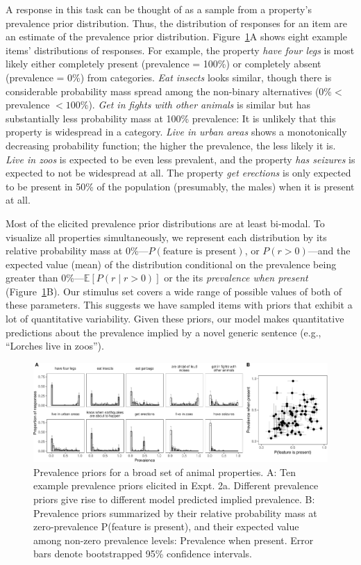 \documentclass[floatsintext,doc]{apa6}
\begin{document}
A response in this task can be thought of as a sample from a property's prevalence prior distribution.
Thus, the distribution of responses for an item are an estimate of the prevalence prior distribution.
Figure~\ref{fig:genInt-prevPrior}A shows eight example items' distributions of responses.
For example, the property \emph{have four legs} is most likely either completely present (prevalence = 100\%) or completely absent (prevalence = 0\%) from categories.
\emph{Eat insects} looks similar, though there is considerable probability mass spread among the non-binary alternatives (\(0\% <\) prevalence \(< 100\%\)).
\emph{Get in fights with other animals} is similar but has substantially less probability mass at 100\% prevalence: It is unlikely that this property is widespread in a category.
\emph{Live in urban areas} shows a monotonically decreasing probability function; the higher the prevalence, the less likely it is.
\emph{Live in zoos} is expected to be even less prevalent, and the property \emph{has seizures} is expected to not be widespread at all.
The property \emph{get erections} is only expected to be present in 50\% of the population (presumably, the males) when it is present at all.

Most of the elicited prevalence prior distributions are at least bi-modal.
To visualize all properties simultaneously, we represent each distribution by its relative probability mass at 0\%---\(P(\text{feature is present})\), or \(P(r > 0)\)---and the expected value (mean) of the distribution conditional on the prevalence being greater than 0\%---\(\mathbb{E}[P(r \mid r>0)]\) or the its \emph{prevalence when present} (Figure~\ref{fig:genInt-prevPrior}B).
Our stimulus set covers a wide range of possible values of both of these parameters.
This suggests we have sampled items with priors that exhibit a lot of quantitative variability.
Given these priors, our model makes quantitative predictions about the prevalence implied by a novel generic sentence (e.g., \enquote{Lorches live in zoos}).

\begin{figure}
\centering
\includegraphics{genint_files/figure-latex/genInt-prevPrior-1.pdf}
\caption{\label{fig:genInt-prevPrior}Prevalence priors for a broad set of animal properties. A: Ten example prevalence priors elicited in Expt. 2a. Different prevalence priors give rise to different model predicted implied prevalence. B: Prevalence priors summarized by their relative probability mass at zero-prevalence P(feature is present), and their expected value among non-zero prevalence levels: Prevalence when present. Error bars denote bootstrapped 95\% confidence intervals.}
\end{figure}
\end{document}
